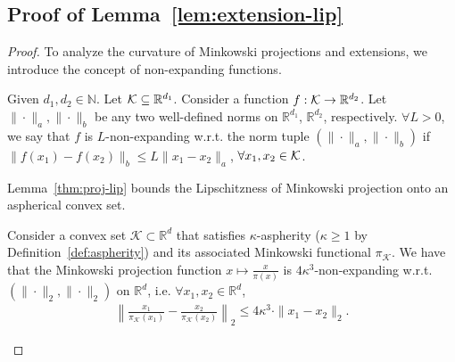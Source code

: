 \subsection{Proof of Lemma~\ref{lem:extension-lip}}

\begin{proof}
To analyze the curvature of Minkowski projections and extensions, we introduce the concept of non-expanding functions.

\begin{definition}
Given $d_1,d_2\in\mathbb{N}$. Let $\mathcal{K}\subseteq \mathbb{R}^{d_1}$.
Consider a function $f:\mathcal{K}\rightarrow\mathbb{R}^{d_2}$. Let $\|\cdot\|_a, \|\cdot\|_b$ be any two well-defined norms on $\mathbb{R}^{d_1}$, $\mathbb{R}^{d_2}$, respectively. $\forall L>0$, we say that $f$ is $L$-non-expanding w.r.t. the norm tuple $(\|\cdot\|_a, \|\cdot\|_b)$ if $\|f(x_1)-f(x_2)\|_b\le L\|x_1-x_2\|_a$, $\forall x_1,x_2\in\mathcal{K}$. 
\end{definition}

Lemma~\ref{thm:proj-lip} bounds the Lipschitzness of Minkowski projection onto an aspherical convex set. 

\begin{lemma} 
\label{thm:proj-lip}
Consider a convex set $\mathcal{K}\subset\mathbb{R}^d$ that satisfies $\kappa$-aspherity ($\kappa\ge 1$ by Definition~\ref{def:aspherity}) and its associated Minkowski functional $\pi_{\mathcal{K}}$.  We have that the Minkowski projection function $x\mapsto \frac{x}{\pi(x)}$ is $4\kappa^3$-non-expanding w.r.t. $(\|\cdot\|_2,\|\cdot\|_2)$ on $\mathbb{R}^d$, i.e. $\forall x_1,x_2\in\mathbb{R}^d$,
\begin{align*}
\left\|\frac{x_1}{\pi_{\mathcal{K}}(x_1)}-\frac{x_2}{\pi_{\mathcal{K}}(x_2)}\right\|_2\le 4\kappa^3\cdot\|x_1-x_2\|_2. 
\end{align*}
\end{lemma}


\end{proof}
